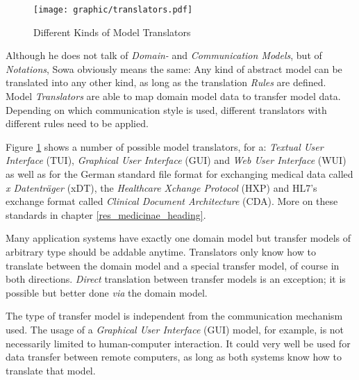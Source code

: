 \begin{figure}[ht]
    \begin{center}
        \texttt{[image: graphic/translators.pdf]}
        \caption{Different Kinds of Model Translators}
        \label{translators_figure}
    \end{center}
\end{figure}

Although he does not talk of \emph{Domain-} and \emph{Communication Models},
but of \emph{Notations}, Sowa obviously means the same: Any kind of abstract
model can be translated into any other kind, as long as the translation
\emph{Rules} are defined. Model \emph{Translators} are able to map domain model
data to transfer model data. Depending on which communication style is used,
different translators with different rules need to be applied.

Figure \ref{translators_figure} shows a number of possible model translators,
for a: \emph{Textual User Interface} (TUI), \emph{Graphical User Interface}
(GUI) and \emph{Web User Interface} (WUI) as well as for the German standard
file format for exchanging medical data called \emph{x Datentr\"ager} (xDT),
the \emph{Healthcare Xchange Protocol} (HXP) and HL7's exchange format called
\emph{Clinical Document Architecture} (CDA). More on these standards in chapter
\ref{res_medicinae_heading}.

Many application systems have exactly one domain model but transfer models of
arbitrary type should be addable anytime. Translators only know how to
translate between the domain model and a special transfer model, of course in
both directions. \emph{Direct} translation between transfer models is an
exception; it is possible but better done \emph{via} the domain model.

The type of transfer model is independent from the communication mechanism
used. The usage of a \emph{Graphical User Interface} (GUI) model, for example,
is not necessarily limited to human-computer interaction. It could very well be
used for data transfer between remote computers, as long as both systems know
how to translate that model.
